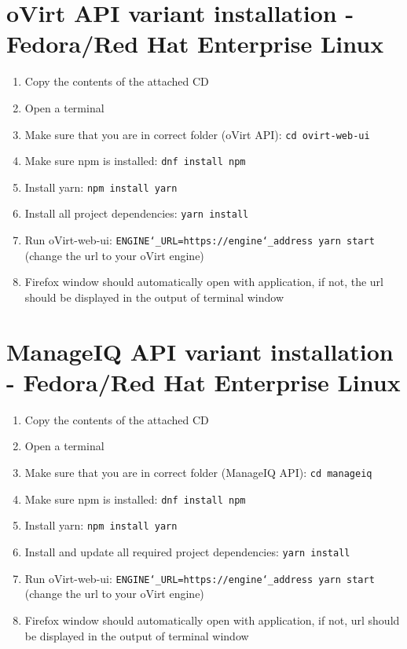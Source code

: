 \section{oVirt API variant installation - Fedora/Red Hat Enterprise Linux}
\begin{enumerate}

\item Copy the contents of the attached CD 
\item Open a terminal
\item Make sure that you are in correct folder (oVirt API): \texttt{cd ovirt-web-ui}
\item Make sure npm is installed: \texttt{dnf install npm}
\item Install yarn: \texttt{npm install yarn}
\item Install all project dependencies: \texttt{yarn install}
\item Run oVirt-web-ui: \texttt{ENGINE\char`_URL=https://engine\char`_address yarn start} (change the url to your oVirt engine)
\item Firefox window should automatically open with application, if not, the url should be displayed in the output of terminal window

\end{enumerate} 
\section{ManageIQ API variant installation - Fedora/Red Hat Enterprise Linux}
\begin{enumerate}

\item Copy the contents of the attached CD 
\item Open a terminal
\item Make sure that you are in correct folder (ManageIQ API): \texttt{cd manageiq}
\item Make sure npm is installed: \texttt{dnf install npm}
\item Install yarn: \texttt{npm install yarn}
\item Install and update all required project dependencies: \texttt{yarn install}
\item Run oVirt-web-ui: \texttt{ENGINE\char`_URL=https://engine\char`_address yarn start} (change the url to your oVirt engine)
\item Firefox window should automatically open with application, if not, url should be displayed in the output of terminal window

\end{enumerate} 
